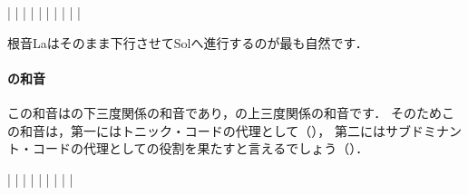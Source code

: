 \documentclass[dvipdfmx,uplatex,b5paper,openany,jbase=12Q,nomag*,textwidth-limit=44%
               ]{gachimuchi}
\begin{document}
\begin{floatMusic}[pos=ht]
  \Startpiece%
  \znotes|\en
  \NOTes
  |%
  \en\bar
  \NOTEs
  |%
  \en\doublebar
  \NOTEs
  |%
  \en\bar
  \NOTEs
  |%
  \en\doublebar
  \NOTes
  |%
  \en\bar
  \NOTes
  \Mryaku\sk%
  |%
  \Mryaku\sk
  \en\setdoublebar
  \endpiece%
\end{floatMusic}
根音La\aFlat はそのまま下行させてSolへ進行するのが最も自然です．


\paragraph{\Gnvi\Min の和音}
この和音は\Gni の下三度関係の和音であり，\Gniv の上三度関係の和音です．
そのためこの和音は，第一にはトニック・コードの代理として（），
第二にはサブドミナント・コードの代理としての役割を果たすと言えるでしょう（）．

\begin{floatMusic}[pos=ht]
  \Startpiece%
  \znotes|\en
  \znotes|\en
  \NOTes
  |%
  \en\bar
  \NOTEs
  |%
  \en\doublebar
  \znotes|\en
  \NOTEs
  |%
  \en\bar
  \NOTEs
  |%
  \en\setdoublebar
  \endpiece%
\end{floatMusic}
\end{document}
